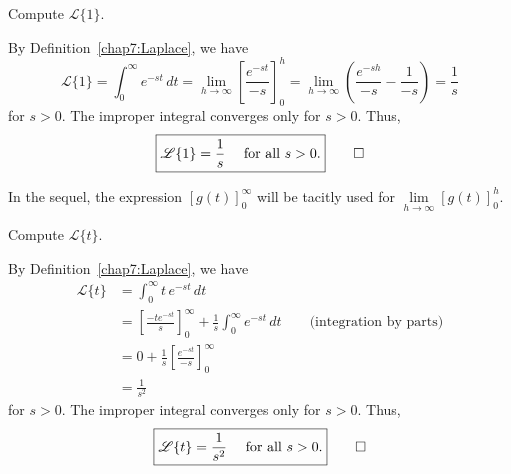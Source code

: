 \begin{example}
	Compute $\mathscr{L}\{1\}.$ 
\end{example}
\begin{solution}
	By Definition~\ref{chap7:Laplace}, we have
	\begin{equation*}
		\mathscr{L} \{1\} = \int_0^\infty e^{-st} \, dt
		=
		\lim_{h\to\infty}
		\left[ \frac{e^{-st}}{-s} \right]_0^h
		=
		\lim_{h\to\infty}
		\left( \frac{e^{-sh}}{-s} - \frac{1}{-s} \right)
		= \frac{1}{s} 
	\end{equation*}
	for $s>0.$ The improper integral converges only for $s>0.$ 
	Thus, 
	\[\boxed{\mathscr{L} \{1\} = \frac{1}{s}\quad \text{ for all } s>0.}\qedhere\]
\end{solution}
In the sequel, the expression \(
\left[ g(t)\right]_0^\infty\) will be tacitly used for
\(\lim\limits_{h\to\infty}
\left[ g(t)\right]_{0}^h.\)
 
 
 
 \begin{example}
 Compute $\mathscr{L}\{t\} .$
 \end{example}
 \begin{solution}
 
 	By Definition~\ref{chap7:Laplace}, we have
\begin{equation*}
	\begin{split}
		\mathscr{L} \{t\}
		& = \int_0^\infty t\,e^{-st}  \, dt \\
		& =
		\left[ \frac{-te^{-st}}{s} \right]_0^\infty
		+
		\frac{1}{s}
		\int_0^\infty e^{-st} \,dt \qquad \text{(integration  by parts)} \\
		& =
		0
		+
		\frac{1}{s}
		\left[ \frac{e^{-st}}{-s} \right]_0^\infty \\
		& =
		\frac{1}{s^2}
	\end{split}
\end{equation*}
 for $s>0.$ The improper integral converges only for $s>0.$ Thus, 
 \[\boxed{\mathscr{L} \{t\} = \frac{1}{s^2}\quad \text{ for all } s>0.}\qedhere\]
\end{solution}


